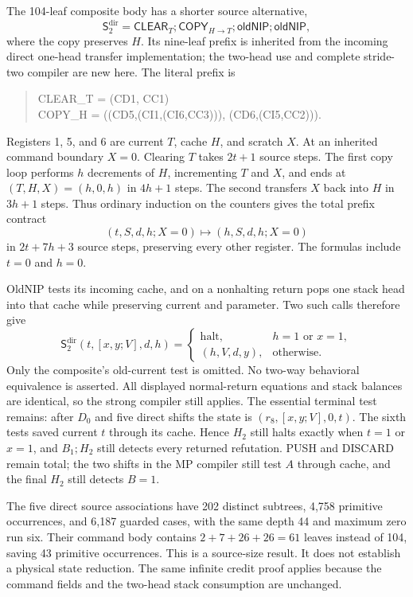 The 104-leaf composite body has a shorter source alternative,
\[
 \mathsf S_2^{\mathrm{dir}}=
 \mathsf{CLEAR}_T;\mathsf{COPY}_{H\to T};
 \mathsf{oldNIP};\mathsf{oldNIP},
\]
where the copy preserves $H$. Its nine-leaf prefix is inherited from
the incoming direct one-head transfer implementation; the two-head use
and complete stride-two compiler are new here. The literal prefix is
\begin{quote}\ttfamily\small
CLEAR\_T = (CD1, CC1)\\
COPY\_H = ((CD5,(CI1,(CI6,CC3))), (CD6,(CI5,CC2))).
\end{quote}
Registers 1, 5, and 6 are current $T$, cache $H$, and scratch $X$.
At an inherited command boundary $X=0$. Clearing $T$ takes $2t+1$
source steps. The first copy loop performs $h$ decrements of $H$,
incrementing $T$ and $X$, and ends at $(T,H,X)=(h,0,h)$ in $4h+1$
steps. The second transfers $X$ back into $H$ in $3h+1$ steps.
Thus ordinary induction on the counters gives the total prefix contract
\[
 (t,S,d,h;X=0)\longmapsto(h,S,d,h;X=0)
\]
in $2t+7h+3$ source steps, preserving every other register. The formulas
include $t=0$ and $h=0$.

OldNIP tests its incoming cache, and on a nonhalting return pops one
stack head into that cache while preserving current and parameter.
Two such calls therefore give
\[
 \mathsf S_2^{\mathrm{dir}}(t,[x,y;V],d,h)=
 \begin{cases}
  \mathrm{halt},&h=1\text{ or }x=1,\\
  (h,V,d,y),&\text{otherwise}.
 \end{cases}
\]
Only the composite's old-current test is omitted. No two-way behavioral
equivalence is asserted. All displayed normal-return equations and
stack balances are identical, so the strong compiler still applies.
The essential terminal test remains: after $D_0$ and five direct shifts
the state is $(r_8,[x,y;V],0,t)$. The sixth tests saved current $t$
through its cache. Hence $H_2$ still halts exactly when $t=1$ or $x=1$,
and $B_1;H_2$ still detects every returned refutation. PUSH and DISCARD
remain total; the two shifts in the MP compiler still test $A$ through
cache, and the final $H_2$ still detects $B=1$.

The five direct source associations have 202 distinct subtrees, 4,758
primitive occurrences, and 6,187 guarded cases, with the same depth 44
and maximum zero run six. Their command body contains
$2+7+26+26=61$ leaves instead of 104, saving 43 primitive occurrences.
This is a source-size result. It does not establish a physical state
reduction. The same infinite credit proof applies because the command
fields and the two-head stack consumption are unchanged.

